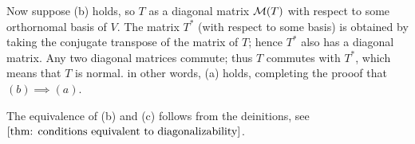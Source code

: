 \begin{prf}
  \StepTwo Now suppose (b) holds, so $T$ as a diagonal matrix $\mathcal{M}(T)$ with respect to some orthornomal basis of $V$. The matrix $T^*$ (with respect to some basis) is obtained by taking the conjugate transpose of the matrix of $T$; hence $T^*$ also has a diagonal matrix. Any two diagonal matrices commute; thus $T$ commutes with $T^*$, which means that $T$ is normal. in other words, (a) holds, completing the prooof that $(b) \implies (a)$.

  \StepThree The equivalence of (b) and (c) follows from the deinitions, see $\ref{thm: conditions equivalent to diagonalizability}$.
\end{prf}